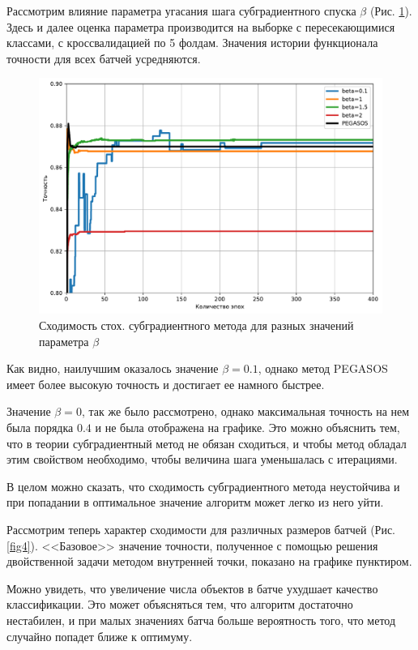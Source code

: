 \documentclass[12pt,fleqn,unicode]{article}
\begin{document}
Рассмотрим влияние параметра угасания шага субградиентного спуска $\beta$ (Рис. \ref{fig3}).
Здесь и далее оценка параметра производится на выборке с пересекающимися классами, с кроссвалидацией по 
5 фолдам. Значения истории функционала точности для всех батчей усредняются.

\begin{figure}[h!]
	\centering
	\caption{Сходимость стох. субградиентного метода для разных значений параметра $\beta$}
	\label{fig3}
	\includegraphics[width=14cm]{../pict/beta.pdf}
\end{figure}

Как видно, наилучшим оказалось значение $\beta = 0.1$, однако метод PEGASOS имеет более высокую точность
и достигает ее намного быстрее.

Значение $\beta = 0$, так же было рассмотрено, однако максимальная точность
на нем была порядка $0.4$ и не была отображена на графике.  Это можно объяснить тем, что в теории 
субградиентный метод не обязан сходиться, и чтобы метод обладал этим свойством необходимо, чтобы величина шага
уменьшалась с итерациями.

В целом можно сказать, что сходимость субградиентного метода неустойчива и при попадании в оптимальное значение
алгоритм может легко из него уйти.

Рассмотрим теперь характер сходимости для различных размеров батчей (Рис. \ref{fig4}). <<Базовое>> значение 
точности, полученное с помощью решения двойственной задачи методом внутренней точки, показано на графике
пунктиром.

Можно увидеть, что увеличение числа объектов в батче ухудшает качество классификации. Это может объясняться тем,
что алгоритм достаточно нестабилен, и при малых значениях батча больше вероятность того, что метод случайно попадет
ближе к оптимуму.
\end{document}
